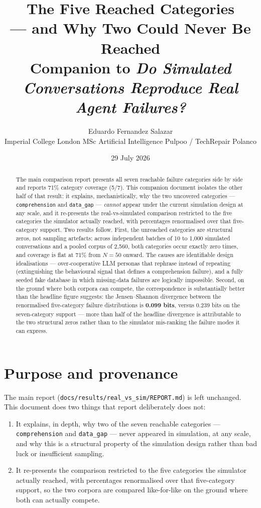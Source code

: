 \documentclass[11pt,a4paper]{article}
\title{\textbf{The Five Reached Categories}\\
\large --- and Why Two Could Never Be Reached\\[2pt]
\normalsize Companion to \emph{Do Simulated Conversations Reproduce Real Agent Failures?}}
\author{Eduardo Fernandez Salazar\\
\small Imperial College London \;\textperiodcentered\; MSc Artificial Intelligence \;\textperiodcentered\; Pulpoo / TechRepair Polanco}
\date{29 July 2026}
\newcommand{\cat}[1]{\texttt{#1}}
\begin{document}
\maketitle

\begin{abstract}
\noindent
The main comparison report presents all seven reachable failure categories side by side and reports
71\% category coverage (5/7). This companion document isolates the other half of that result: it
explains, mechanistically, why the two uncovered categories --- \cat{comprehension} and
\cat{data\_gap} --- \emph{cannot} appear under the current simulation design at any scale, and it
re-presents the real-vs-simulated comparison restricted to the five categories the simulator
actually reached, with percentages renormalised over that five-category support. Two results
follow. First, the unreached categories are structural zeros, not sampling artefacts: across
independent batches of 10 to 1{,}000 simulated conversations and a pooled corpus of 2{,}560, both
categories occur exactly zero times, and coverage is flat at 71\% from $N{=}50$ onward. The causes
are identifiable design idealisations --- over-cooperative LLM personas that rephrase instead of
repeating (extinguishing the behavioural signal that defines a comprehension failure), and a fully
seeded fake database in which missing-data failures are logically impossible. Second, on the ground
where both corpora can compete, the correspondence is substantially better than the headline
figure suggests: the Jensen--Shannon divergence between the renormalised five-category failure
distributions is \textbf{0.099 bits}, versus 0.239 bits on the seven-category support --- more than
half of the headline divergence is attributable to the two structural zeros rather than to the
simulator mis-ranking the failure modes it can express.
\end{abstract}

\section{Purpose and provenance}

The main report (\texttt{docs/results/real\_vs\_sim/REPORT.md}) is left unchanged. This document
does two things that report deliberately does not:

\begin{enumerate}[nosep]
  \item It explains, in depth, why two of the seven reachable categories ---
        \cat{comprehension} and \cat{data\_gap} --- never appeared in simulation, at any scale,
        and why this is a structural property of the simulation design rather than bad luck or
        insufficient sampling.
  \item It re-presents the comparison restricted to the five categories the simulator actually
        reached, with percentages renormalised over that five-category support, so the two corpora
        are compared like-for-like on the ground where both can actually compete.
\end{enumerate}
\end{document}
